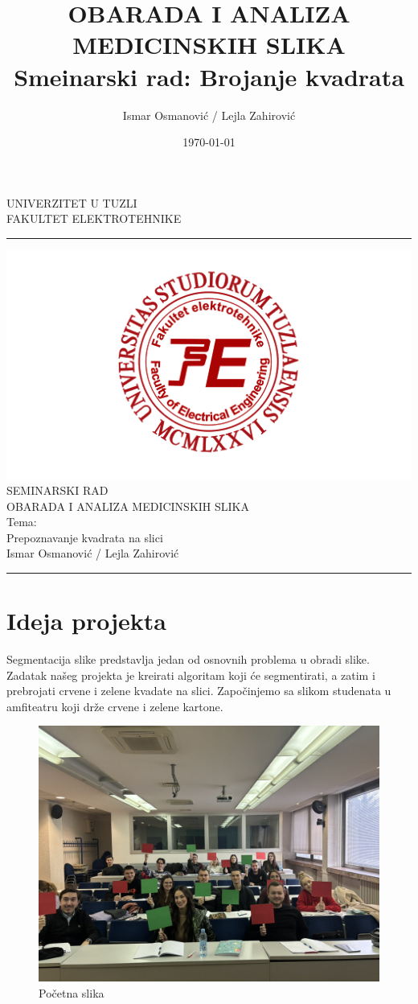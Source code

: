\documentclass[a4paper,12pt]{article}
\title{OBARADA I ANALIZA MEDICINSKIH SLIKA \\ Smeinarski rad: Brojanje kvadrata}
\author{Ismar Osmanović / Lejla Zahirović}
\date{\today}
\begin{document}
\begin{center}
\thispagestyle{empty}
\large{UNIVERZITET U TUZLI \\ FAKULTET ELEKTROTEHNIKE}

\noindent\rule[7pt]{\linewidth}{0.4pt}


  \includegraphics[width=0.7\linewidth]{fet_logo.png}
\vspace{3cm}\\
{\fontsize{34pt}{28pt}\selectfont SEMINARSKI RAD}\\
\large{OBARADA I ANALIZA MEDICINSKIH SLIKA}\\
\vspace{2cm}
\Huge{Tema:}\\
\Huge{Prepoznavanje kvadrata na slici}\\
\vspace{0.5cm}
\large{Ismar Osmanović / Lejla Zahirović}
\vfill

\noindent\rule[7pt]{\linewidth}{0.4pt}
\end{center}
\newpage
\thispagestyle{empty}
\tableofcontents
\newpage
{} 

\section{Ideja projekta}
Segmentacija slike predstavlja jedan od osnovnih problema u obradi slike. 
Zadatak našeg projekta je kreirati algoritam koji će segmentirati, a zatim i prebrojati crvene i zelene kvadate na slici.
Započinjemo sa slikom studenata u amfiteatru koji drže crvene i zelene kartone.
\begin{figure}[h]
    \centering
    \includegraphics[width=\textwidth]{../img/studenti.jpg}
    \caption{Početna slika}
    \label{fig:example}
\end{figure}
\newpage
\end{document}
